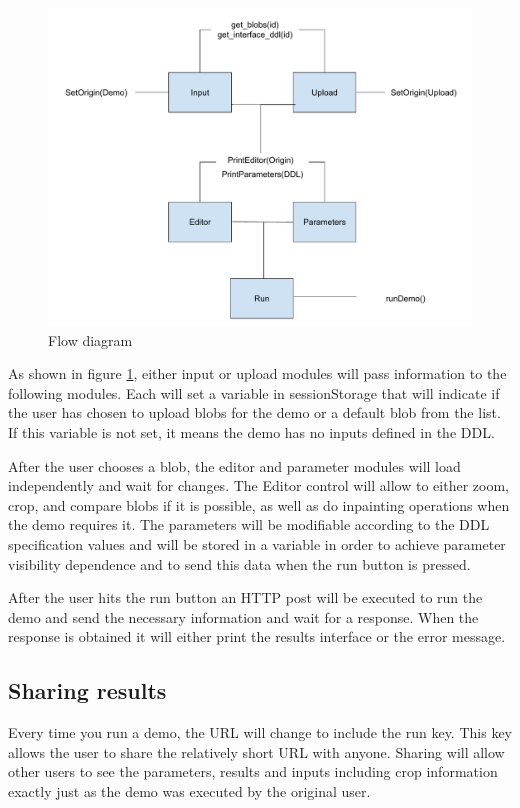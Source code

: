 \begin{figure}[h]
	\centering
	\includegraphics[width=\textwidth]{images/flow}
	\caption{Flow diagram} 
	\label{fig:flow_diagram}
\end{figure} 


As shown in figure  \ref{fig:flow_diagram}, either input or upload modules will pass 
information to the following modules. Each will set a variable in sessionStorage that will indicate if the user has chosen to 
upload blobs for the demo or a default blob from the list. If this variable is not set, it means the demo has no inputs defined 
in the DDL.

After the user chooses a blob, the editor and parameter modules will load independently and wait for changes. The Editor control 
will allow to either zoom, crop, and compare blobs if it is possible, as well as do inpainting operations when the demo requires it. 
The parameters will be modifiable according to the DDL specification values and will be stored in a variable in order to achieve 
parameter visibility dependence and to send this data when the run button is pressed.

After the user hits the run button an HTTP post will be executed to run the demo and send the necessary information and wait for 
a response. When the response is obtained it will either print the results interface or the error message.


\subsection{Sharing results}
Every time you run a demo, the URL will change to include the run key. This key allows the user to share the relatively short URL 
with anyone. Sharing will allow other users to see the parameters, results and inputs including crop information exactly just as the 
demo was executed by the original user. 

